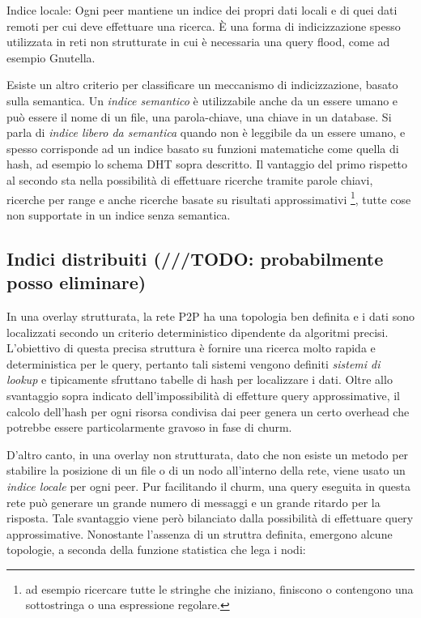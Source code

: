Indice locale: Ogni peer mantiene un indice dei propri dati locali e di
quei dati remoti per cui deve effettuare una ricerca. È una forma di
indicizzazione spesso utilizzata in reti non strutturate in cui è
necessaria una query flood, come ad esempio Gnutella.

Esiste un altro criterio per classificare un meccanismo di
indicizzazione, basato sulla semantica. Un \emph{indice semantico} è
utilizzabile anche da un essere umano e può essere il nome di un file,
una parola-chiave, una chiave in un database. Si parla di \emph{indice
libero da semantica} quando non è leggibile da un essere umano, e spesso
corrisponde ad un indice basato su funzioni matematiche come quella di
hash, ad esempio lo schema DHT sopra descritto. Il vantaggio del primo
rispetto al secondo sta nella possibilità di effettuare ricerche tramite
parole chiavi, ricerche per range e anche ricerche basate su risultati
approssimativi \footnote{ad esempio ricercare tutte le stringhe che
  iniziano, finiscono o contengono una sottostringa o una espressione
  regolare.}, tutte cose non supportate in un indice senza semantica.

\subsection{Indici distribuiti (///TODO: probabilmente posso
eliminare)}\label{indici-distribuiti-todo-probabilmente-posso-eliminare}

In una overlay strutturata, la rete P2P ha una topologia ben definita e
i dati sono localizzati secondo un criterio deterministico dipendente da
algoritmi precisi. L'obiettivo di questa precisa struttura è fornire una
ricerca molto rapida e deterministica per le query, pertanto tali
sistemi vengono definiti \emph{sistemi di lookup} e tipicamente
sfruttano tabelle di hash per localizzare i dati. Oltre allo svantaggio
sopra indicato dell'impossibilità di effetture query approssimative, il
calcolo dell'hash per ogni risorsa condivisa dai peer genera un certo
overhead che potrebbe essere particolarmente gravoso in fase di churm.

D'altro canto, in una overlay non strutturata, dato che non esiste un
metodo per stabilire la posizione di un file o di un nodo all'interno
della rete, viene usato un \emph{indice locale} per ogni peer. Pur
facilitando il churm, una query eseguita in questa rete può generare un
grande numero di messaggi e un grande ritardo per la risposta. Tale
svantaggio viene però bilanciato dalla possibilità di effettuare query
approssimative. Nonostante l'assenza di un struttra definita, emergono
alcune topologie, a seconda della funzione statistica che lega i nodi:

